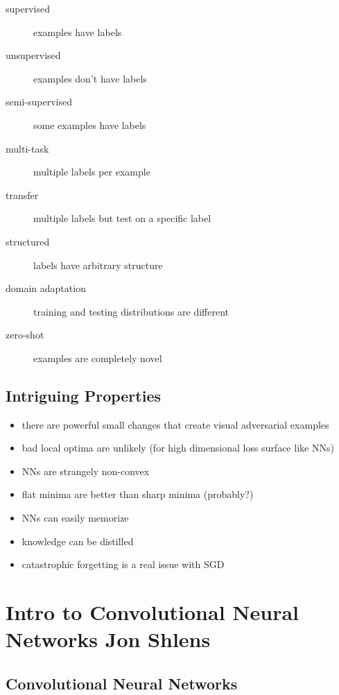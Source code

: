 \documentclass[]{article}
\theoremstyle{definition}
\begin{document}
    \begin{description}
        \item[supervised] examples have labels
        \item[unsupervised] examples don't have labels
        \item[semi-supervised] some examples have labels
        \item[multi-task] multiple labels per example
        \item[transfer] multiple labels but test on a specific label
        \item[structured] labels have arbitrary structure
        \item[domain adaptation] training and testing distributions are different
        \item[zero-shot] examples are completely novel
    \end{description}

    \subsection{Intriguing Properties}%
    \label{sub:intriguing_properties}

    \begin{itemize}
        \item there are powerful small changes that create visual adversarial examples
        \item bad local optima are unlikely (for high dimensional loss surface like NNs)
        \item NNs are strangely non-convex
        \item flat minima are better than sharp minima (probably?)
        \item NNs can easily memorize
        \item knowledge can be distilled
        \item catastrophic forgetting is a real issue with SGD
    \end{itemize}

    \section{Intro to Convolutional Neural Networks {\small Jon Shlens}}%
    \label{sec:introduction_to_cnns_small_jonathan_shlens_}

    \subsection{Convolutional Neural Networks}%
    \label{sub:convolutional_neural_networks}
\end{document}
